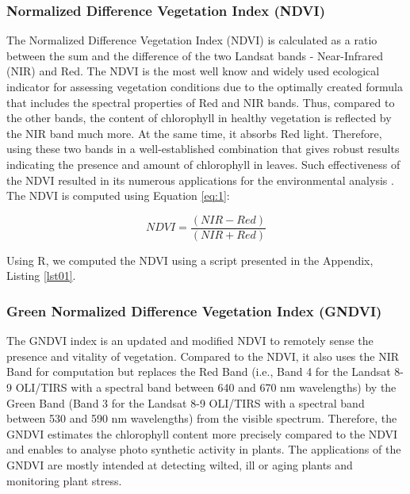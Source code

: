 \documentclass[jimaging,article,submit,pdftex,moreauthors]{Definitions/mdpi}
\begin{document}
\subsubsection{Normalized Difference Vegetation Index (NDVI)}
The Normalized Difference Vegetation Index (NDVI) \cite{Rouse} is calculated as a ratio between the sum and the difference of the two Landsat bands - Near-Infrared (NIR) and Red. The NDVI is the most well know and widely used ecological indicator for assessing vegetation conditions due to the optimally created formula that includes the spectral properties of Red and NIR bands. Thus, compared to the other bands, the content of chlorophyll in healthy vegetation is reflected by the NIR band much more. At the same time, it absorbs Red light. Therefore, using these two bands in a well-established combination that gives robust results indicating the presence and amount of chlorophyll in leaves. Such effectiveness of the NDVI resulted in its numerous applications for the environmental analysis \cite{w13192707,rs12244119,GHEBREZGABHER2020249,RULINDA2012169}. The NDVI is computed using Equation \ref{eq:1}:

\begin{equation}\label{eq:1}
NDVI=\dfrac{(NIR-Red)}{(NIR+Red)}
\end{equation}

Using R, we computed the NDVI using a script presented in the Appendix, Listing \ref{lst01}. 

\subsubsection{Green Normalized Difference Vegetation Index (GNDVI)}

The GNDVI index is an updated and modified NDVI to remotely sense the presence and vitality of vegetation. Compared to the NDVI, it also uses the NIR Band for computation but replaces the Red Band (i.e., Band 4 for the Landsat 8-9 OLI/TIRS with a spectral band between 640 and 670 nm wavelengths) by the Green Band (Band 3 for the Landsat 8-9 OLI/TIRS with a spectral band between 530 and 590 nm wavelengths) from the visible spectrum. Therefore, the GNDVI estimates the chlorophyll content more precisely compared to the NDVI and enables to analyse photo synthetic activity in plants. The applications of the GNDVI are mostly intended at detecting wilted, ill or aging plants and monitoring plant stress. 
\end{document}

